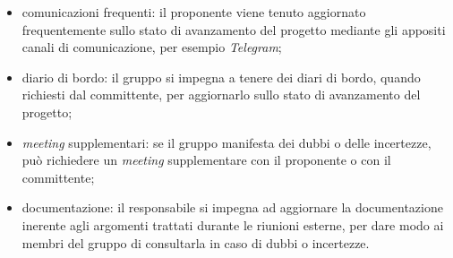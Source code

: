 \begin{itemize}
\begin{itemize}
		      \item comunicazioni frequenti: il proponente viene tenuto
		            aggiornato frequentemente sullo stato di avanzamento del
		            progetto mediante gli appositi canali di comunicazione, per
		            esempio \textit{Telegram};

		      \item diario di bordo: il gruppo si impegna a tenere dei diari di
		            bordo, quando richiesti dal committente, per aggiornarlo
		            sullo stato di avanzamento del progetto;

		      \item \textit{meeting} supplementari: se il gruppo manifesta dei
		            dubbi o delle incertezze, può richiedere un \textit{meeting}
		            supplementare con il proponente o con il committente;

		      \item documentazione: il responsabile si impegna ad aggiornare
		            la documentazione inerente agli argomenti trattati durante
		            le riunioni esterne, per dare modo ai membri del gruppo di
		            consultarla in caso di dubbi o incertezze.
	      \end{itemize}
\end{itemize}
